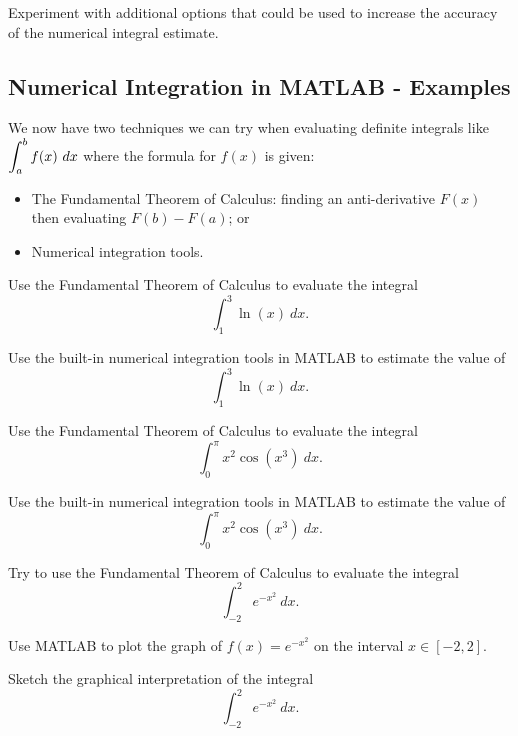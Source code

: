 Experiment with additional options that could be used to increase the
accuracy of the numerical integral estimate.


\newpage

\subsection*{Numerical Integration in MATLAB - Examples}

We now have two techniques we can try when evaluating definite
integrals like $\displaystyle \int_a^b f(x)~dx$ where the formula for $f(x)$ is
given:
\begin{itemize}
\item The Fundamental Theorem of Calculus: finding an anti-derivative
  $F(x)$ then evaluating $F(b) - F(a)$;  or \\[1ex]
\item Numerical integration tools. \\[1ex]
\end{itemize}

\newpage

\problem Use the Fundamental Theorem of Calculus to evaluate the
integral
$$\int_1^3 \ln(x)~dx.$$

\vfill

Use the built-in numerical integration tools in MATLAB to estimate the
value of
$$\int_1^3 \ln(x)~dx.$$
\vspace{1in}


\newpage
\problem Use the Fundamental Theorem of Calculus to evaluate the
integral
$$\int_0^{\pi} x^2 \cos(x^3)~dx.$$

\vfill

Use the built-in numerical integration tools in MATLAB to estimate the
value of
$$\int_0^{\pi} x^2 \cos(x^3)~dx.$$
\vspace{1in}

\newpage
\problem Try to use the Fundamental Theorem of Calculus to evaluate
the integral
$$\int_{-2}^{2} e^{-x^2}~dx.$$

\vfill

\newpage

\problem Use MATLAB to plot the graph of $f(x) = e^{-x^2}$ on the
interval $x\in [-2, 2]$.

\vspace{1in}

Sketch the graphical interpretation of the integral
$$\int_{-2}^{2} e^{-x^2}~dx.$$
\vfill

